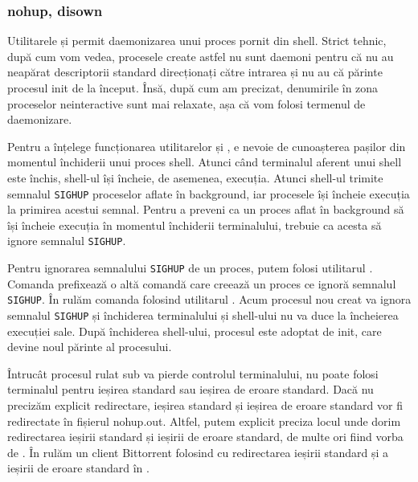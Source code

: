 \subsubsection{nohup, disown}
\label{sec:process-interactivitate-detasare-nohup}

Utilitarele  și  permit daemonizarea unui proces pornit din shell.
Strict tehnic, după cum vom vedea, procesele create astfel nu sunt daemoni pentru că nu
au neapărat descriptorii standard direcționați către intrarea  și nu au
că părinte procesul init de la început. Însă, după cum am precizat, denumirile
în zona proceselor neinteractive sunt mai relaxate, așa că vom folosi termenul
de daemonizare.

Pentru a înțelege funcționarea utilitarelor  și , e nevoie de
cunoașterea pașilor din momentul închiderii unui proces shell. Atunci când
terminalul aferent unui shell este închis, shell-ul își încheie, de asemenea, execuția.
Atunci shell-ul trimite semnalul \texttt{SIGHUP} proceselor aflate în background, iar
procesele își încheie execuția la primirea acestui semnal. Pentru a preveni ca
un proces aflat în background să își încheie execuția în momentul închiderii
terminalului, trebuie ca acesta să ignore semnalul \texttt{SIGHUP}.


Pentru ignorarea semnalului \texttt{SIGHUP} de un proces, putem folosi utilitarul .
Comanda  prefixează o altă comandă care creează un proces ce ignoră
semnalul \texttt{SIGHUP}. În  rulăm comanda  folosind
utilitarul .
Acum procesul  nou creat va ignora semnalul \texttt{SIGHUP} și închiderea
terminalului și shell-ului nu va duce la încheierea execuției sale. După
închiderea shell-ului, procesul este adoptat de init, care devine noul părinte
al procesului.


Întrucât procesul rulat sub  va pierde controlul terminalului, nu poate
folosi terminalul pentru ieșirea standard sau ieșirea de eroare standard. Dacă
nu precizăm explicit redirectare, ieșirea standard și ieșirea de eroare standard
vor fi redirectate în fișierul nohup.out. Altfel, putem explicit preciza locul
unde dorim redirectarea ieșirii standard și ieșirii de eroare standard, de multe
ori fiind vorba de . În  rulăm un client Bittorrent
folosind  cu redirectarea ieșirii standard și a ieșirii de eroare standard
în .

